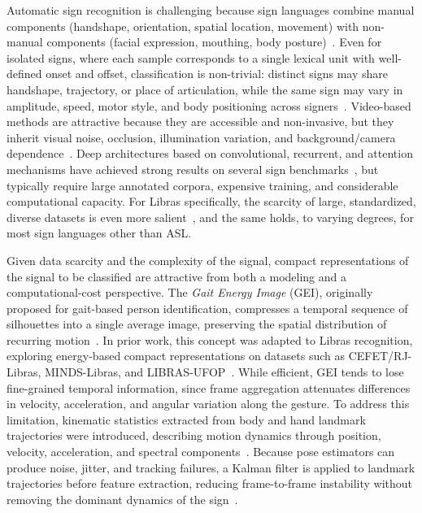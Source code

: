 \documentclass[journal]{IEEEtran}
\begin{document}
Automatic sign recognition is challenging because sign languages combine manual components (handshape, orientation, spatial location, movement) with non-manual components (facial expression, mouthing, body posture)~\cite{cheok2019review}. Even for isolated signs, where each sample corresponds to a single lexical unit with well-defined onset and offset, classification is non-trivial: distinct signs may share handshape, trajectory, or place of articulation, while the same sign may vary in amplitude, speed, motor style, and body positioning across signers~\cite{rastgoo2021,sarhan2023islr}. Video-based methods are attractive because they are accessible and non-invasive, but they inherit visual noise, occlusion, illumination variation, and background/camera dependence~\cite{cheok2019review}. Deep architectures based on convolutional, recurrent, and attention mechanisms have achieved strong results on several sign benchmarks~\cite{rastgoo2021,sarhan2023islr,wadhawan2020static}, but typically require large annotated corpora, expensive training, and considerable computational capacity. For Libras specifically, the scarcity of large, standardized, diverse datasets is even more salient~\cite{costa2025review}, and the same holds, to varying degrees, for most sign languages other than ASL.

Given data scarcity and the complexity of the signal, compact representations of the signal to be classified are attractive from both a modeling and a computational-cost perspective. The \emph{Gait Energy Image} (GEI), originally proposed for gait-based person identification, compresses a temporal sequence of silhouettes into a single average image, preserving the spatial distribution of recurring motion~\cite{han2006gei}. In prior work, this concept was adapted to Libras recognition, exploring energy-based compact representations on datasets such as CEFET/RJ-Libras, MINDS-Libras, and LIBRAS-UFOP~\cite{passos2021}. While efficient, GEI tends to lose fine-grained temporal information, since frame aggregation attenuates differences in velocity, acceleration, and angular variation along the gesture. To address this limitation, kinematic statistics extracted from body and hand landmark trajectories were introduced, describing motion dynamics through position, velocity, acceleration, and spectral components~\cite{rego2025}. Because pose estimators can produce noise, jitter, and tracking failures, a Kalman filter is applied to landmark trajectories before feature extraction, reducing frame-to-frame instability without removing the dominant dynamics of the sign~\cite{kalman1960,wan2023kalman}.
\end{document}
